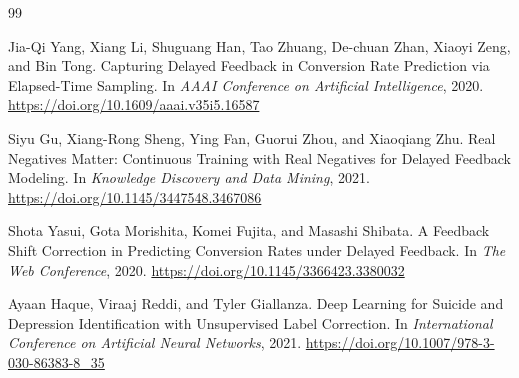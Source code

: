 \documentclass{article}
\begin{document}
\begin{thebibliography}{99}

Jia-Qi Yang, Xiang Li, Shuguang Han, Tao Zhuang, De-chuan Zhan, Xiaoyi Zeng, and Bin Tong.
\newblock Capturing Delayed Feedback in Conversion Rate Prediction via Elapsed-Time Sampling.
\newblock In \textit{AAAI Conference on Artificial Intelligence}, 2020.
\newblock \url{https://doi.org/10.1609/aaai.v35i5.16587}

Siyu Gu, Xiang-Rong Sheng, Ying Fan, Guorui Zhou, and Xiaoqiang Zhu.
\newblock Real Negatives Matter: Continuous Training with Real Negatives for Delayed Feedback Modeling.
\newblock In \textit{Knowledge Discovery and Data Mining}, 2021.
\newblock \url{https://doi.org/10.1145/3447548.3467086}

Shota Yasui, Gota Morishita, Komei Fujita, and Masashi Shibata.
\newblock A Feedback Shift Correction in Predicting Conversion Rates under Delayed Feedback.
\newblock In \textit{The Web Conference}, 2020.
\newblock \url{https://doi.org/10.1145/3366423.3380032}

Ayaan Haque, Viraaj Reddi, and Tyler Giallanza.
\newblock Deep Learning for Suicide and Depression Identification with Unsupervised Label Correction.
\newblock In \textit{International Conference on Artificial Neural Networks}, 2021.
\newblock \url{https://doi.org/10.1007/978-3-030-86383-8_35}

\end{thebibliography}
\end{document}
